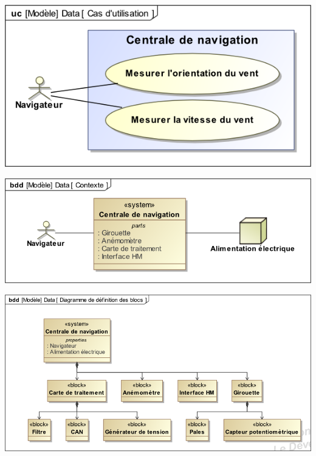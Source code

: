 \documentclass[10pt]{article}
\newif\ifprof
\begin{document}
\ifprof
\else
\vspace{.25cm}

\begin{minipage}[c]{.32\linewidth}
\begin{center}
\includegraphics[width=\textwidth]{images/uc}
\end{center}
\end{minipage} \hfill
\begin{minipage}[c]{.32\linewidth}
\begin{center}
\includegraphics[width=\textwidth]{images/contexte}
\end{center}
\end{minipage}  \hfill
\begin{minipage}[c]{.32\linewidth}
\begin{center}
\includegraphics[width=\textwidth]{images/bdd}
\end{center}
\end{minipage} 
\end{document}
